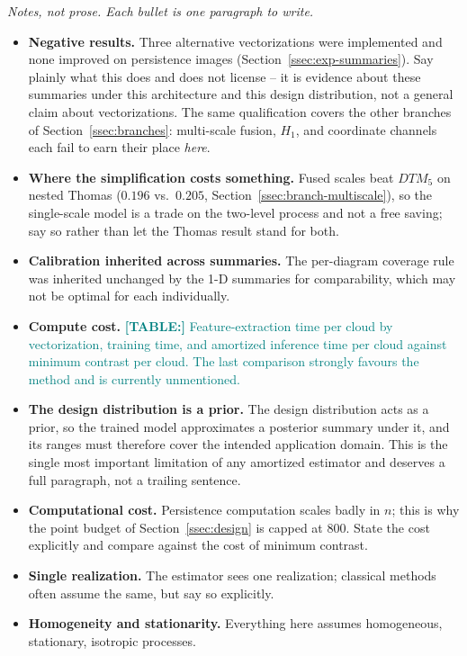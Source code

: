 \documentclass[11pt,letterpaper]{article}
\newcommand{\1}{\mathds{1}}
\newcommand{\tab}[1]{\textcolor{teal}{\textbf{[TABLE:] }#1}}
\newcommand{\fig}[1]{\textcolor{magenta}{\textbf{[FIGURE:] }#1}}
\newcommand{\expt}[1]{\textcolor{orange}{\textbf{[EXPT:] }#1}}
\newcommand{\tab}[1]{}\newcommand{\fig}[1]{}\newcommand{\expt}[1]{}
\theoremstyle{plain}
\theoremstyle{definitioncolon}
\begin{document}
\emph{Notes, not prose. Each bullet is one paragraph to write.}
\begin{itemize}
    \item \textbf{Negative results.} Three alternative vectorizations were
    implemented and none improved on persistence images
    (Section~\ref{ssec:exp-summaries}). Say plainly what this does and does not
    license -- it is evidence about these summaries under this architecture and
    this design distribution, not a general claim about vectorizations. The
    same qualification covers the other branches of
    Section~\ref{ssec:branches}: multi-scale fusion, $H_1$, and coordinate
    channels each fail to earn their place \emph{here}.
    \item \textbf{Where the simplification costs something.} Fused scales beat
    $DTM_5$ on nested Thomas ($0.196$ vs.\ $0.205$,
    Section~\ref{ssec:branch-multiscale}), so the single-scale model is a trade
    on the two-level process and not a free saving; say so rather than let the
    Thomas result stand for both.
    \item \textbf{Calibration inherited across summaries.} The per-diagram
    coverage rule was inherited unchanged by the 1-D summaries for
    comparability, which may not be optimal for each individually.
    \item \textbf{Compute cost.} \tab{Feature-extraction time per cloud by
    vectorization, training time, and amortized inference time per cloud
    against minimum contrast per cloud. The last comparison strongly favours
    the method and is currently unmentioned.}
    \item \textbf{The design distribution is a prior.} The design distribution
    acts as a prior, so the trained model approximates a posterior summary
    under it, and its ranges must therefore cover the intended application
    domain. This is the single most important limitation of any amortized
    estimator and deserves a full paragraph, not a trailing sentence.
    \item \textbf{Computational cost.} Persistence computation scales badly in
    $n$; this is why the point budget of Section~\ref{ssec:design} is capped at
    800. State the cost explicitly and compare against the cost of minimum
    contrast.
    \item \textbf{Single realization.} The estimator sees one realization;
    classical methods often assume the same, but say so explicitly.
    \item \textbf{Homogeneity and stationarity.} Everything here assumes
    homogeneous, stationary, isotropic processes.
\end{itemize}
\end{document}
